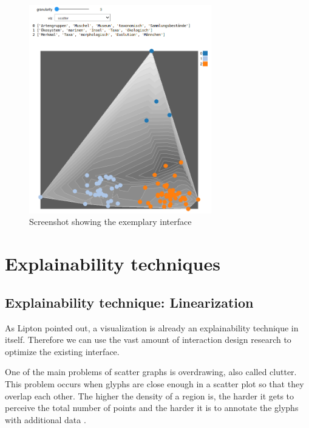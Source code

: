 \begin{figure}[t]
	\centering
	\includegraphics[width=300px]{../chapters/implementation/pics/interface}
	\caption{\label{pic:interface} Screenshot showing the exemplary interface}
\end{figure}

\section{Explainability techniques}

\subsection{Explainability technique: Linearization}

As Lipton \cite{liptonMythosModelInterpretability2016a} pointed out, a visualization is already an explainability technique in itself. Therefore we can use the vast amount of interaction design research to optimize the existing interface. 

One of the main problems of scatter graphs is overdrawing, also called clutter. This problem occurs when glyphs are close enough in a scatter plot so that they overlap each other. The higher the density of a region is, the harder it gets to perceive the total number of points and the harder it is to annotate the glyphs with additional data \cite{mayorgaSplatterplotsOvercomingOverdraw2013}. 


